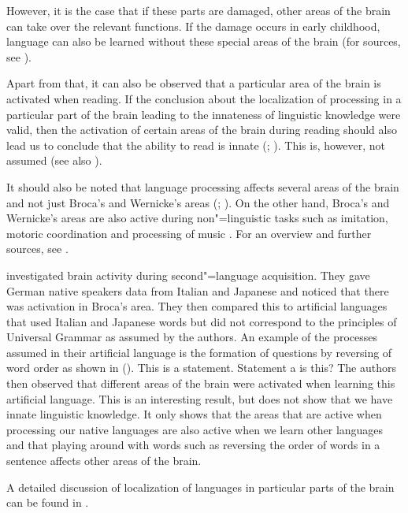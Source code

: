 However, it is the case that if these parts are damaged, other areas of the brain can take over the relevant
functions. If the damage occurs in early childhood, language can also be learned without these special areas
of the brain (for sources, see \citealp[Section~4.1]{Dabrowska2004a}).

Apart from that, it can also be observed that a particular area of the brain is activated when reading. If the conclusion about the localization of processing 
in a particular part of the brain leading to the innateness of linguistic knowledge were valid, then the activation of certain
areas of the brain during reading should also lead us to conclude that the ability to read is innate (\citealp[\page ]{EBJKSPP96a};
\citealp[]{Bishop2002a}). This is, however, not assumed (see also \citealp*[]{FHC2005a}). 

It should also be noted that language processing affects several areas of the brain and not just Broca's and Wernicke's areas (\citealp[]{FM2005a}; \citealp{Friederici2009a}). On the other hand, Broca's and Wernicke's areas are also active during non"=linguistic tasks
such as imitation, motoric coordination and processing of music \citep{MKGF2001a}. For an overview and further sources,
see .

\citet{MMGRRBW2003a} investigated brain activity during second"=language acquisition. They gave German native speakers data from Italian and Japanese and noticed
that there was activation in Broca's area. They then compared this to artificial languages that used Italian and Japanese words but did
not correspond to the principles of Universal Grammar as assumed by the authors. An example of the processes assumed in their artificial language is the formation
of questions by reversing of word order as shown in ().
\eal
\ex This is a statement.
\ex Statement a is this?
\zl
The authors then observed that different areas of the brain were activated when learning this artificial language. This is an interesting result, but does not show
that we have innate linguistic knowledge. It only shows that the areas that are active when processing our native languages are also active when we learn other
languages and that playing around with words such as reversing the order of words in a sentence affects other areas of the brain.

A detailed discussion of localization of languages in particular parts of the brain can be found
in .



